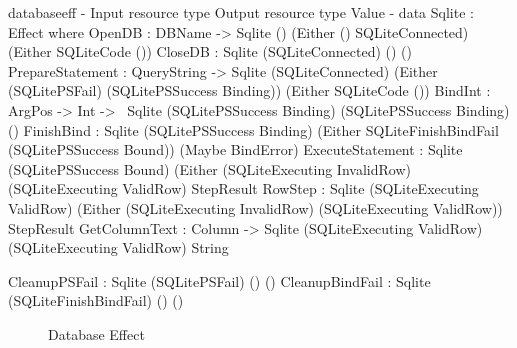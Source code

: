 \begin{SaveVerbatim}{databaseeff}
{-                           { Input resource type }    { Output resource type }             { Value }           -}
data Sqlite : Effect where
  OpenDB            : DBName -> 
                      Sqlite ()                         (Either () SQLiteConnected)          (Either SQLiteCode ())
  CloseDB           : Sqlite (SQLiteConnected)          ()                                   ()
  PrepareStatement  : QueryString -> 
                      Sqlite (SQLiteConnected)          (Either (SQLitePSFail) 
                                                          (SQLitePSSuccess Binding))         (Either SQLiteCode ())
  BindInt           : ArgPos -> Int -> 
                      Sqlite (SQLitePSSuccess Binding)  (SQLitePSSuccess Binding)            ()
  FinishBind        : Sqlite (SQLitePSSuccess Binding)  (Either SQLiteFinishBindFail
                                                          (SQLitePSSuccess Bound))           (Maybe BindError)
  ExecuteStatement  : Sqlite (SQLitePSSuccess Bound)    (Either (SQLiteExecuting InvalidRow)
                                                          (SQLiteExecuting ValidRow)         StepResult
  RowStep           : Sqlite (SQLiteExecuting ValidRow) (Either (SQLiteExecuting InvalidRow)
                                                          (SQLiteExecuting ValidRow))        StepResult
  GetColumnText     : Column -> 
                      Sqlite (SQLiteExecuting ValidRow) (SQLiteExecuting ValidRow)           String
                      
  CleanupPSFail     : Sqlite (SQLitePSFail)             ()                                   ()
  CleanupBindFail   : Sqlite (SQLiteFinishBindFail)     ()                                   ()

\end{SaveVerbatim}

\begin{figure*}[t]
\begin{center}
\end{center}
\caption{Database Effect}
\label{fig:dbeffect}
\end{figure*}

